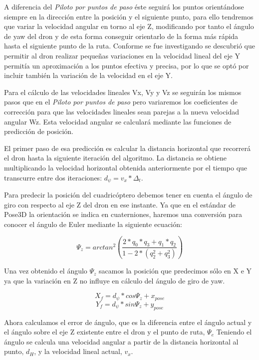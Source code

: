 \hspace{1cm} A diferencia del \textit{Piloto por puntos de paso} éste seguirá los puntos orientándose siempre en la dirección entre la posición y el siguiente punto, para ello tendremos que variar la velocidad angular en torno al eje Z, modificando por tanto el ángulo de yaw del dron y de esta forma conseguir orientarlo de la forma más rápida hasta el siguiente punto de la ruta. Conforme se fue investigando se descubrió que permitir al dron realizar pequeñas variaciones en la velocidad lineal del eje Y permitía un aproximación a los puntos efectiva y precisa, por lo que se optó por incluir también la variación de la velocidad en el eje Y.

\hspace{1cm} Para el cálculo de las velocidades lineales Vx, Vy y Vz se seguirán los mismos pasos que en el \textit{Piloto por puntos de paso} pero variaremos los coeficientes de corrección para que las velocidades lineales sean parejas a la nueva velocidad angular Wz. Esta velocidad angular se calculará mediante las funciones de predicción de posición. 

\hspace{1cm} El primer paso de esa predicción es calcular la distancia horizontal que recorrerá el dron hasta la siguiente iteración del algoritmo. La distancia se obtiene multiplicando la velocidad horizontal obtenida anteriormente por el tiempo que transcurre entre dos iteraciones: \(d_{\psi} = v_{x} * \Delta_{t}\).

\hspace{1cm} Para predecir la posición del cuadricóptero debemos tener en cuenta el ángulo de giro con respecto al eje Z del dron en ese instante. Ya que en el estándar de Pose3D la orientación se indica en cuaterniones, haremos una conversión para conocer el ángulo de Euler mediante la siguiente ecuación:

\[ \Psi_{z} = arctan^{2}\left( \frac{2*q_{0}*q_{3}+q_{1}*q_{2}}{1-2*(q_{2}^{2}+q_{3}^{2})}\right) \]
 
\hspace{1cm} Una vez obtenido el ángulo $\Psi_{z}$ sacamos la posición que predecimos sólo en X e Y ya que la variación en Z no influye en cálculo del ángulo de giro de yaw.

\[ X_{f} = d_{\psi} * cos \Psi_{z} + x_{pose} \] 
\[ Y_{f} = d_{\psi} * sin \Psi_{z} + y_{pose} \]

\hspace{1cm} Ahora calculamos el error de ángulo, que es la diferencia entre el ángulo actual y el ángulo sobre el eje Z existente entre el dron y el punto de ruta, $\Psi_{e}$ Teniendo el ángulo se calcula una velocidad angular a partir de la distancia horizontal al punto, $d_{H}$, y la velocidad lineal actual, $v_{x}$.
 
